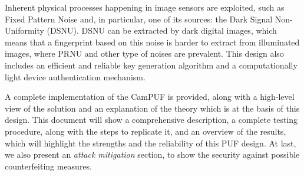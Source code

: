 Inherent physical processes happening in image sensors are exploited, such as Fixed Pattern Noise and, in particular, one of its sources: the Dark Signal Non-Uniformity (DSNU).
DSNU can be extracted by dark digital images, which means that a fingerprint based on this noise is harder to extract from illuminated images, where PRNU and other type of noises are prevalent.
This design also includes an efficient and reliable key generation algorithm and a computationally light device authentication mechanism.

A complete implementation of the CamPUF is provided, along with a high-level view of the solution and an explanation of the theory which is at the basis of this design.
This document will show a comprehensive description, a complete testing procedure, along with the steps to replicate it, and an overview of the results, which
will highlight the strengths and the reliability of this PUF design. At last, we also present an \textit{attack mitigation} section, to show the security against
possible counterfeiting measures.





